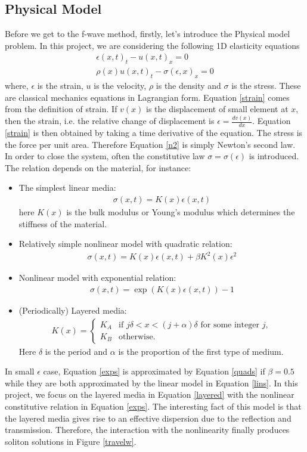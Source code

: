 \documentclass{article}
\begin{document}
\subsection{Physical Model}
Before we get to the f-wave method, firstly, let's introduce the Physical model problem. In this project, we are considering the following 1D elasticity equations
\begin{align}
\epsilon(x,t)_t-u(x,t)_x=0 \label{strain}\\
\rho(x) u(x,t)_t-\sigma(\epsilon,x)_x=0 \label{n2}
\end{align}
where, $\epsilon$ is the strain, $u$ is the velocity, $\rho$ is the density and $\sigma$ is the stress. These are classical mechanics equations in Lagrangian form. Equation \eqref{strain} comes from the definition of strain. If $v(x)$ is the displacement of small element at $x$, then the strain, i.e. the relative change of displacement is $\epsilon=\frac{dv(x)}{dx}$. Equation \eqref{strain} is then obtained by taking a time derivative of the equation. The stress is the force per unit area. Therefore Equation \eqref{n2} is simply Newton's second law. In order to close the system, often the constitutive law $\sigma=\sigma(\epsilon)$ is introduced. The relation depends on the material, for instance:
\begin{itemize}
\item The simplest linear media:
\begin{align}
\sigma(x,t)=K(x)\epsilon(x,t)
\label{lins}
\end{align}
here $K(x)$ is the bulk modulus or Young's modulus which determines the stiffness of the material.
\item Relatively simple nonlinear model with quadratic relation:
\begin{align}
\sigma(x,t)=K(x)\epsilon(x,t)+\beta K^2(x)\epsilon^2
\label{quads}
\end{align}
\item Nonlinear model with exponential relation:
\begin{align}
\sigma(x,t)=\exp(K(x)\epsilon(x,t))-1
\label{exps}
\end{align}
\item (Periodically) Layered media:
\begin{align}
K(x)=\left\{
\begin{array}{cc}
K_A & \mbox{if }j\delta<x<(j+\alpha)\delta \mbox{ for some integer } j,\\
K_B & \mbox{otherwise.}
\end{array}
\right.
\label{layered}
\end{align}
Here $\delta$ is the period and $\alpha$ is the proportion of the first type of medium.
\end{itemize}
In small $\epsilon$ case, Equation \eqref{exps} is approximated by Equation \eqref{quads} if $\beta=0.5$ while they are both approximated by the linear model in Equation \eqref{lins}. In this project, we focus on the layered media in Equation \eqref{layered} with the nonlinear constitutive relation in Equation \eqref{exps}. The interesting fact of this model is that the layered media gives rise to an effective dispersion due to the reflection and transmission. Therefore, the interaction with the nonlinearity finally produces soliton solutions in Figure \ref{travelw}.
\end{document}
